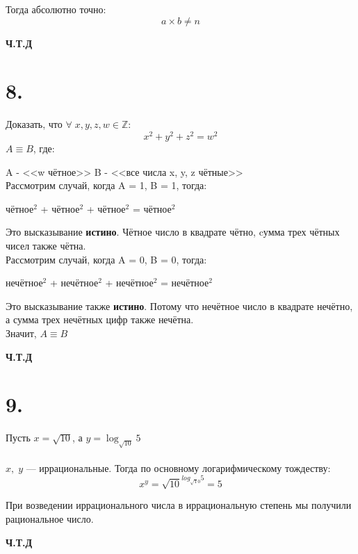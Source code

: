 \documentclass[a4paper,12pt]{article}
\begin{document}
Тогда абсолютно точно:
\[ a \times b \neq n\]

\textbf{Ч.Т.Д}
\section*{8.}
Доказать, что $ \forall \; x,y,z,w \in \mathbb{Z} $:
\[ x^2 + y^2 + z^2 = w^2\] 
$ A \equiv B $, где:

A - <<w чётное>>
B - <<все числа x, y, z чётные>>\\

Рассмотрим случай,  когда  A = 1, B = 1, тогда:

чётное$^2$ + чётное$^2$  + чётное$^2$ = чётное$^2$

Это высказывание \textbf{истино}. Чётное число в квадрате чётно, cумма трех чётных чисел также чётна.\\ 

Рассмотрим случай, когда A = 0, B = 0, тогда:

нечётное$^2$ + нечётное$^2$ + нечётное$^2$ = нечётное$^2$

Это высказывание также \textbf{истино}.  Потому что нечётное число в квадрате нечётно, а сумма трех нечётных цифр также нечётна.\\

Значит, $A \equiv B $ 

\textbf{Ч.Т.Д}
\section*{9.}
Пусть $x = \sqrt{10}$, а $ y = \log_{\sqrt{10}}5 $\\\\ $x,\;y$ --- иррациональные. Тогда по основному логарифмическому тождеству:
\[ x ^ y = \sqrt{10}^{log_{\sqrt10}5} = 5\]

При возведении иррационального числа в иррациональную степень мы получили рациональное число.

\textbf{Ч.Т.Д}
\end{document}
